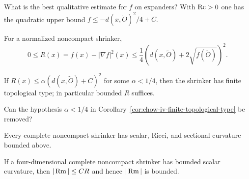 \begin{claim}
\label{prob:chow-iv-expander-potential}
What is the best qualitative estimate for $f$ on expanders?  With $\operatorname{Rc}>0$ one
has the quadratic upper bound $f\le-d(x,\widetilde O)^2/4+C$.
\end{claim}

\begin{lemma}
\label{lem:chow-iv-scalar-quadratic-upper}
For a normalized noncompact shrinker,
\[
0\le R(x)=f(x)-|\nabla f|^2(x)\le\frac14(d(x,\widetilde O)+2\sqrt{f(\widetilde O)})^2.
\]
\end{lemma}

\begin{corollary}
\label{cor:chow-iv-finite-topological-type}
If $R(x)\le\alpha(d(x,\widetilde O)+C)^2$ for some $\alpha<1/4$, then the
shrinker has finite topological type; in particular bounded $R$ suffices.
\end{corollary}

\begin{claim}
\label{prob:chow-iv-critical-growth}
Can the hypothesis $\alpha<1/4$ in Corollary~\ref{cor:chow-iv-finite-topological-type}
be removed?
\end{claim}

\begin{conjecture}
\label{conj:chow-iv-bounded-curvature-conjecture}
Every complete noncompact shrinker has scalar, Ricci, and sectional curvature
bounded above.
\end{conjecture}

\begin{theorem}
\label{thm:chow-iv-four-dimensional-curvature}
If a four-dimensional complete noncompact shrinker has bounded scalar curvature,
then $|\operatorname{Rm}|\le C R$ and hence $|\operatorname{Rm}|$ is bounded.
\end{theorem}

